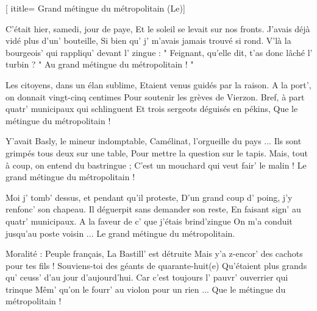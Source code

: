  [
ititle= {Grand métingue du métropolitain (Le)}]


\beginverse
C'était hier, samedi, jour de paye,
Et le soleil se levait sur nos fronts.
J'avais déjà vidé plus d'un' bouteille,
Si bien qu' j' m'avais jamais trouvé si rond.
V'là la bourgeois' qui rappliqu' devant l' zingue :
" Feignant, qu'elle dit, t'as donc lâché l' turbin ? "
 {Au grand métingue du métropolitain ! " }
\endverse

\beginverse
Les citoyens, dans un élan sublime,
Etaient venus guidés par la raison.
A la port', on donnait vingt-cinq centimes
Pour soutenir les grèves de Vierzon.
Bref, à part quatr' municipaux qui schlinguent
Et trois sergeots déguisés en pékins,
 {Que le métingue du métropolitain !}
\endverse

\beginverse
Y'avait Basly, le mineur indomptable,
Camélinat, l'orgueille du pays ...
Ils sont grimpés tous deux sur une table,
Pour mettre la question sur le tapis.
Mais, tout à coup, on entend du bastringue ;
C'est un mouchard qui veut fair' le malin !
 {Le grand métingue du métropolitain !}
\endverse

\beginverse
Moi j' tomb' dessus, et pendant qu'il proteste,
D'un grand coup d' poing, j'y renfonc' son chapeau.
Il déguerpit sans demander son reste,
En faisant sign' au quatr' municipaux.
A la faveur de c' que j'étais brind'zingue
On m'a conduit jusqu'au poste voisin ...
 {Le grand métingue du métropolitain.}
\endverse

\beginverse
Moralité :
Peuple français, La Bastill' est détruite
Mais y'a z-encor' des cachots pour tes fils !
Souviens-toi des géants de quarante-huit(e)
Qu'étaient plus grands qu' ceuss' d'au jour d'aujourd'hui.
Car c'est toujours l' pauvr' ouverrier qui trinque
Mêm' qu'on le fourr' au violon pour un rien ...
 {Que le métingue du métropolitain !}
\endverse

\endsong
